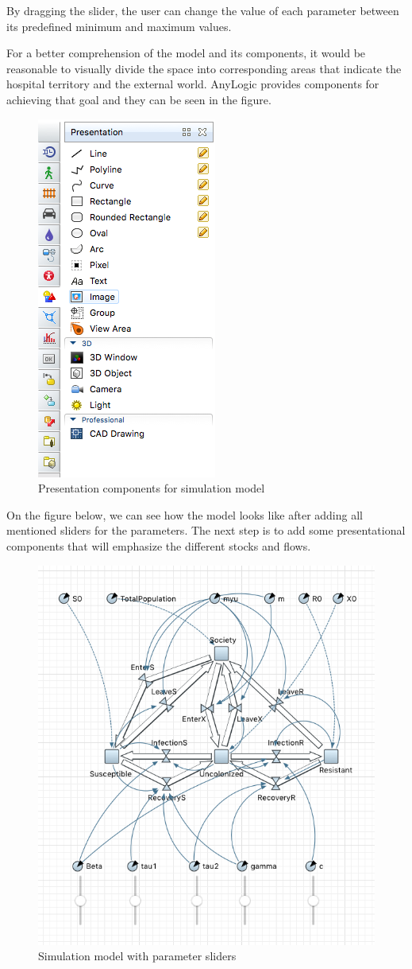 By dragging the slider, the user can change the value of each parameter between its predefined minimum and maximum values.

For a better comprehension of the model and its components, it would be reasonable to visually divide the space into corresponding areas that indicate the hospital territory and the external world. AnyLogic provides components for achieving that goal and they can be seen in the figure.

\begin{figure}[H]
  \centering
  \includegraphics[height=0.5\textwidth]{img/screens/boxes/boxes1}
  \caption{Presentation components for simulation model}
\end{figure}

On the figure below, we can see how the model looks like after adding all mentioned sliders for the parameters. The next step is to add some presentational components that will emphasize the different stocks and flows.

\begin{figure}[H]
  \centering
  \includegraphics[height=0.6\textwidth]{img/screens/boxes/boxes2}
  \caption{Simulation model with parameter sliders}
\end{figure}

